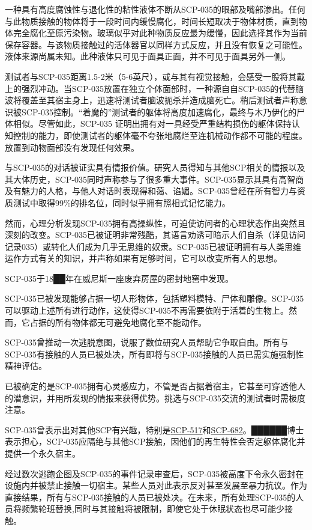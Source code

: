 一种具有高度腐蚀性与退化性的粘性液体不断从SCP-035的眼部及嘴部渗出。任何与此物质接触的物体将于一段时间内缓慢腐化，时间长短取决于物体材质，直到物体完全腐化至原污染物。玻璃似乎对此种物质反应最为缓慢，因此选择其作为当前保存容器。与该物质接触过的活体器官以同样方式反应，并且没有恢复之可能性。液体来源尚属未知。此种液体只可见于面具正面，并不可见于面具另外一侧。

测试者与SCP-035距离1.5-2米（5-6英尺），或与其有视觉接触，会感受一股将其戴上的强烈冲动。当SCP-035放置在独立个体面部时，一种源自自SCP-035的代替脑波将覆盖至其宿主身上，迅速将测试者脑波扼杀并造成脑死亡。稍后测试者声称意识被SCP-035控制。“着魔的”测试者的躯体将高度加速腐化，最终与木乃伊化的尸体相似。尽管如此，SCP-035 证明出拥有对一具经受严重结构损伤的躯体保持认知控制的能力，即使测试者的躯体毫不夸张地腐烂至连机械动作都不可能的程度。放置到动物面部没有发现任何效果。

与SCP-035的对话被证实具有情报价值。研究人员得知与其他SCP相关的情报以及其大体历史，SCP-035同时声称参与了很多重大事件。SCP-035显示其具有高智商及有魅力的人格，与他人对话时表现得和蔼、谄媚。SCP-035曾经在所有智力与资质测试中取得99\%的排名位，同时似乎拥有照相式记忆能力。

然而，心理分析发现SCP-035拥有高操纵性，可迫使访问者的心理状态作出突然且深刻的改变。SCP-035已被证明非常残酷，其语言劝诱可暗示人们自杀（详见访问记录035）或转化人们成为几乎无思维的奴隶。SCP-035已被证明拥有与人类思维运作方式有关的知识，并声称如果有足够时间，它可以改变所有人的思想。

SCP-035于18██年在威尼斯一座废弃房屋的密封地窖中发现。

SCP-035已被发现能够占据一切人形物体，包括塑料模特、尸体和雕像。SCP-035可以驱动上述所有进行动作，这使得SCP-035不再需要依附于活着的生物上。然而，它占据的所有物体都无可避免地腐化至不能动作。

SCP-035曾推动一次逃脱意图，说服了数位研究人员帮助它争取自由。所有与SCP-035有接触的人员已被处决，所有即将与SCP-035接触的人员已需实施强制性精神评估。

已被确定的是SCP-035拥有心灵感应力，不管是否占据着宿主，它甚至可穿透他人的潜意识，并用所发现的情报来获得优势。挑选与SCP-035交流的测试者时需极度注意。

SCP-035曾表示出对其他SCP有兴趣，特别是\hyperref[chap:SCP-517-ARC]{SCP-517}和\hyperref[chap:SCP-682]{SCP-682}。██████博士表示担心，SCP-035应隔绝与其他SCP接触，因他们的再生特性会否定躯体腐化并提供一个永久宿主。

经过数次逃跑企图及SCP-035的事件记录审查后，SCP-035被高度下令永久密封在设施内并被禁止接触一切宿主。某些人员对此表示反对甚至发展至暴力抗议。作为直接结果，所有与SCP-035接触的人员已被处决。在未来，所有处理SCP-035的人员将频繁轮班替换,同时与其接触将被限制，即使它处于休眠状态也尽可能少接触。

